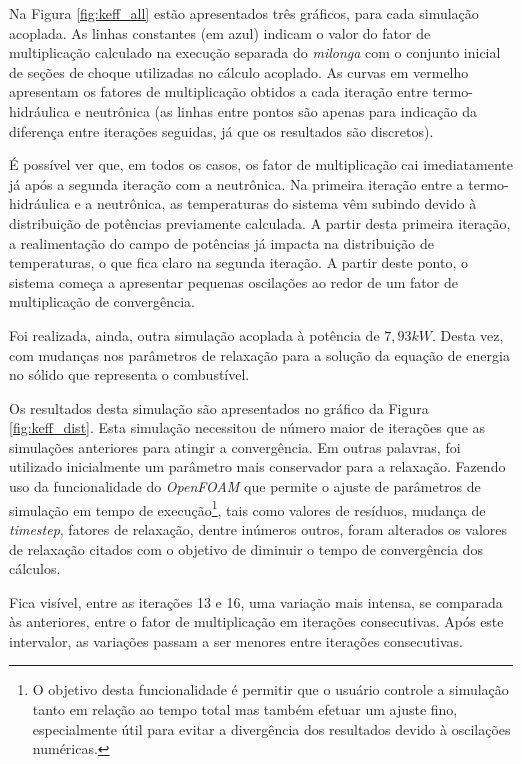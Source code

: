 Na Figura \ref{fig:keff_all} estão apresentados três gráficos, para cada simulação
acoplada. As linhas constantes (em azul) indicam o valor do fator de multiplicação
calculado na execução separada do \textit{milonga} com o conjunto inicial de seções
de choque utilizadas no cálculo acoplado. As curvas em vermelho apresentam os fatores
de multiplicação obtidos a cada iteração entre termo-hidráulica e neutrônica (as linhas
entre pontos são apenas para indicação da diferença entre iterações seguidas, já
que os resultados são discretos).

É possível ver que, em todos os casos, os fator de multiplicação cai imediatamente
já após a segunda iteração com a neutrônica. Na primeira iteração entre a
termo-hidráulica e a neutrônica, as temperaturas do sistema vêm subindo devido
à distribuição de potências previamente calculada. A partir desta primeira iteração,
a realimentação do campo de potências já impacta na distribuição de temperaturas,
o que fica claro na segunda iteração. A partir deste ponto, o sistema começa a
apresentar pequenas oscilações ao redor de um fator de multiplicação de convergência.

%
%
%

Foi realizada, ainda, outra simulação acoplada à potência de $7,93 kW$.
Desta vez, com mudanças nos parâmetros de relaxação para a solução
da equação de energia no sólido que representa o combustível.

Os resultados desta simulação são apresentados no gráfico da Figura \ref{fig:keff_dist}.
Esta simulação necessitou de número maior de iterações que as simulações anteriores para
atingir a convergência. Em outras palavras, foi utilizado inicialmente um parâmetro
mais conservador para a relaxação. Fazendo uso da funcionalidade do \textit{OpenFOAM}
que permite o ajuste de parâmetros de simulação em tempo de execução\footnote{O objetivo desta funcionalidade é permitir que o
usuário controle a simulação tanto em relação ao tempo total mas também
efetuar um ajuste fino, especialmente útil para evitar a divergência dos
resultados devido à oscilações numéricas.}, tais como
valores de resíduos, mudança de \textit{timestep}, fatores de relaxação, dentre
inúmeros outros, foram alterados os valores de relaxação citados com o objetivo
de diminuir o tempo de convergência dos cálculos.

Fica visível, entre as iterações 13 e 16, uma variação mais intensa, se comparada
às anteriores, entre o fator de multiplicação em iterações consecutivas. Após
este intervalor, as variações passam a ser menores entre iterações consecutivas.

